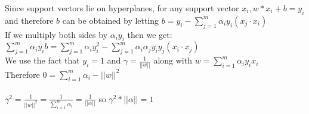 \documentclass[11pt]{article}
\begin{document}
Since support vectors lie on hyperplanes, for any support vector $x_i, w * x_i + b = y_i$ and therefore $b$ can be obtained by letting $b = y_i - \displaystyle\sum_{j=1}^m \alpha_i y_i (x_j \cdot x_i)$\\
If we multiply both sides by $\alpha_i y_i$ then we get:\\
$\displaystyle\sum_{j=1}^m \alpha_i y_i b = \displaystyle\sum_{j=1}^m \alpha_i y_i^2
 - \displaystyle\sum_{j=1}^m \alpha_i \alpha_j y_iy_j (x_i \cdot x_j)$\\
 We use the fact that $y_i = 1$ and $\gamma = \frac{1}{||w||}$ along with $w = \displaystyle\sum_{i=1}^m \alpha_i y_i x_i$\\
 Therefore $0 = \displaystyle\sum_{i=1}^m \alpha_i - ||w||^2$\\\\
 $\gamma^2 = \frac{1}{||w||^2} = \frac{1}{\displaystyle\sum_{i=1}^m \alpha_i} = \frac{1}{||\alpha||}$ so $\gamma^2 * ||\alpha|| = 1$
  
\end{document}
